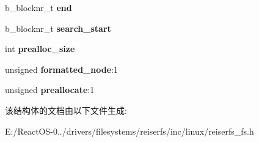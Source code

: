 \begin{DoxyCompactItemize}
b\+\_\+blocknr\+\_\+t {\bfseries end}
\item 
\mbox{\label{struct____reiserfs__blocknr__hint_a4ca59fbaa87e61adf27fb4d69b8811ca}} 
b\+\_\+blocknr\+\_\+t {\bfseries search\+\_\+start}
\item 
\mbox{\label{struct____reiserfs__blocknr__hint_ae18af36b6674de6e657c0b344575c77f}} 
int {\bfseries prealloc\+\_\+size}
\item 
\mbox{\label{struct____reiserfs__blocknr__hint_a65214f06dc34fa15e6efb6eb5962e6e6}} 
unsigned {\bfseries formatted\+\_\+node}\+:1
\item 
\mbox{\label{struct____reiserfs__blocknr__hint_a4305cb8f985e737fca060c9f9f6e000d}} 
unsigned {\bfseries preallocate}\+:1
\end{DoxyCompactItemize}


该结构体的文档由以下文件生成\+:\begin{DoxyCompactItemize}
\item 
E\+:/\+React\+O\+S-\/0../drivers/filesystems/reiserfs/inc/linux/reiserfs\+\_\+fs.\+h\end{DoxyCompactItemize}
